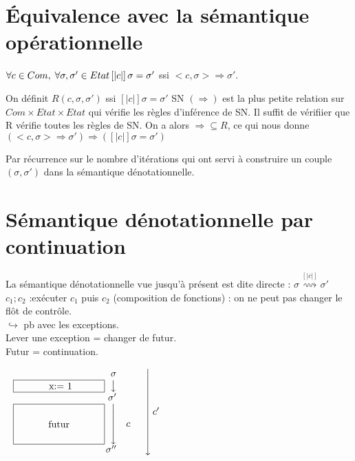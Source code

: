 \documentclass[10pt,a4paper]{article}
\newcommand{\semm}[1]{\left[| #1 | \right]}
\begin{document}
\section{Équivalence avec la sémantique opérationnelle}
\begin{thm} $\forall c \in Com, \; \forall \sigma, \sigma' \in Etat\\
\semm{c} \sigma = \sigma'$ ssi $<c, \sigma> \Rightarrow \sigma'$.\\
\end{thm}

\begin{dem}[Winskel] \fbox{$\Leftarrow$} On définit $R(c, \sigma, \sigma')$ ssi $\semm{c} \sigma = \sigma'$
SN $(\Rightarrow)$ est la plus petite relation sur $Com \times Etat \times Etat$ qui vérifie les règles d'inférence de SN.
Il suffit de vérifiier que R vérifie toutes les règles de SN.
On a alors $\Rightarrow \subseteq R$, ce qui nous donne $(<c, \sigma> \Rightarrow \sigma') \Longrightarrow (\semm{c} \sigma = \sigma')$


\fbox{$\Rightarrow$} Par récurrence sur le nombre d'itérations qui ont servi à construire un couple $(\sigma, \sigma')$ dans la sémantique dénotationnelle.
\end{dem}


\section{Sémantique dénotationnelle par continuation}

La sémantique dénotationnelle vue jusqu'à présent est dite directe : $ \sigma \stackrel{\semm{c}}{\rightsquigarrow} \sigma'$\\
$c_1;c_2$ :\og  exécuter $c_1$ puis $c_2$ \fg (composition de fonctions) : on ne peut pas changer le flôt de contrôle.\\
$\hookrightarrow $ pb avec les exceptions.\\
Lever une exception = changer de futur.\\
Futur = continuation.

$\left.\begin{array}{r l l}
  \sigma & \\
 \left.\fbox{
 \begin{minipage}{3cm}
 \centering x:= 1
 \end{minipage}} \hspace{0.2cm}\right\downarrow& \\
 \sigma' & \\
\left.\fbox{
 \begin{minipage}{3cm}
\vspace{0.5cm}
\centering futur
\vspace{0.5cm} \quad
 \end{minipage}}\hspace{0.2cm}\right\downarrow &   c& \\
 \sigma'' & \\
\end{array}\right\downarrow c'$\qquad \qquad \qquad  \textcolor{red}{}
\end{document}
